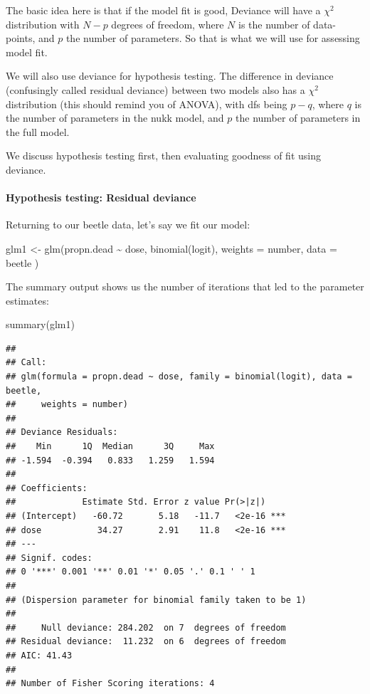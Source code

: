 \documentclass[
  12pt,
]{krantz}
\newenvironment{Shaded}{\begin{snugshade}}{\end{snugshade}}
\newcommand{\AttributeTok}[1]{\textcolor[rgb]{0.77,0.63,0.00}{#1}}
\newcommand{\FunctionTok}[1]{\textcolor[rgb]{0.00,0.00,0.00}{#1}}
\newcommand{\NormalTok}[1]{#1}
\newcommand{\OtherTok}[1]{\textcolor[rgb]{0.56,0.35,0.01}{#1}}
\newcommand{\SpecialCharTok}[1]{\textcolor[rgb]{0.00,0.00,0.00}{#1}}
\theoremstyle{definition}
\theoremstyle{definition}
\theoremstyle{definition}
\theoremstyle{definition}
\theoremstyle{remark}
\begin{document}
The basic idea here is that if the model fit is good, Deviance will have a \(\chi^2\) distribution with \(N-p\) degrees of freedom, where \(N\) is the number of data-points, and \(p\) the number of parameters.
So that is what we will use for assessing model fit.

We will also use deviance for hypothesis testing.
The difference in deviance (confusingly called residual deviance) between two models also has a \(\chi^2\) distribution (this should remind you of ANOVA), with dfs being \(p-q\), where \(q\) is the number of parameters in the nukk model, and \(p\) the number of parameters in the full model.

We discuss hypothesis testing first, then evaluating goodness of fit using deviance.

\hypertarget{hypothesis-testing-residual-deviance}{%
\paragraph{Hypothesis testing: Residual deviance}\label{hypothesis-testing-residual-deviance}}

Returning to our beetle data, let's say we fit our model:

\begin{Shaded}
\begin{Highlighting}[]
\NormalTok{glm1 }\OtherTok{\textless{}{-}} \FunctionTok{glm}\NormalTok{(propn.dead }\SpecialCharTok{\textasciitilde{}}\NormalTok{ dose, }\FunctionTok{binomial}\NormalTok{(logit),}
  \AttributeTok{weights =}\NormalTok{ number, }\AttributeTok{data =}\NormalTok{ beetle}
\NormalTok{)}
\end{Highlighting}
\end{Shaded}

The summary output shows us the number of iterations that led to the parameter estimates:

\begin{Shaded}
\begin{Highlighting}[]
\FunctionTok{summary}\NormalTok{(glm1)}
\end{Highlighting}
\end{Shaded}

\begin{verbatim}
## 
## Call:
## glm(formula = propn.dead ~ dose, family = binomial(logit), data = beetle, 
##     weights = number)
## 
## Deviance Residuals: 
##    Min      1Q  Median      3Q     Max  
## -1.594  -0.394   0.833   1.259   1.594  
## 
## Coefficients:
##             Estimate Std. Error z value Pr(>|z|)    
## (Intercept)   -60.72       5.18   -11.7   <2e-16 ***
## dose           34.27       2.91    11.8   <2e-16 ***
## ---
## Signif. codes:  
## 0 '***' 0.001 '**' 0.01 '*' 0.05 '.' 0.1 ' ' 1
## 
## (Dispersion parameter for binomial family taken to be 1)
## 
##     Null deviance: 284.202  on 7  degrees of freedom
## Residual deviance:  11.232  on 6  degrees of freedom
## AIC: 41.43
## 
## Number of Fisher Scoring iterations: 4
\end{verbatim}
\end{document}
